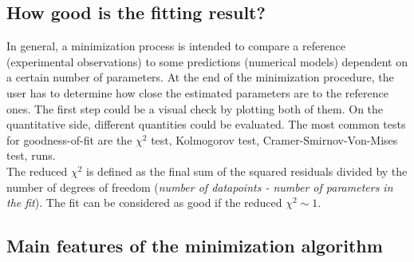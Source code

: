 \subsection{How good is the fitting result?}

In general, a minimization process is intended to compare a reference
(experimental observations) to some predictions (numerical models)
dependent on a certain number of parameters. At the end of the
minimization procedure, the user has to determine how close the estimated parameters are to the reference ones.
The first step could be a visual check by plotting both of them. On
the quantitative side, different quantities could be evaluated. The
most common tests for goodness-of-fit are the $\chi^2$ test,
Kolmogorov test, Cramer-Smirnov-Von-Mises test, runs. \\
The reduced $\chi^2$ is defined as the final sum of the squared residuals
divided by the number of degrees of freedom (\textit{number of datapoints -
number of parameters in the fit}). The
fit can be considered as good if the reduced $\chi^2 \sim 1$. \\



\subsection{Main features of the minimization algorithm}

